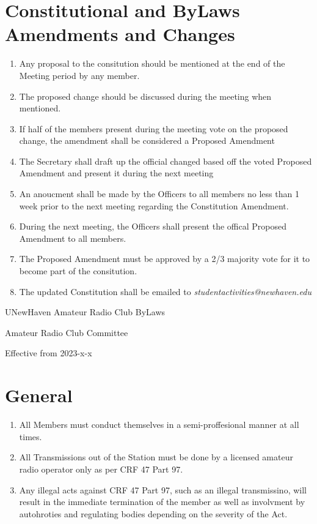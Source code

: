 \documentclass[a4paper,12pt]{article}
\begin{document}
\section{Constitutional and ByLaws Amendments and Changes}
\begin{enumerate}[label=\thesection.\arabic*.]
  \item Any proposal to the consitution should be mentioned at the end of the Meeting period by any member.
  \item The proposed change should be discussed during the meeting when mentioned.
  \item If half of the members present during the meeting vote on the proposed change, the amendment shall be considered a Proposed Amendment
  \item The Secretary shall draft up the official changed based off the voted Proposed Amendment and present it during the next meeting
  \item An anoucment shall be made by the Officers to all members no less than 1 week prior to the next meeting regarding the Constitution Amendment.
  \item During the next meeting, the Officers shall present the offical Proposed Amendment to all members.
  \item The Proposed Amendment must be approved by a 2/3 majority vote for it to become part of the consitution.
  \item The updated Constitution shall be emailed to \textit{studentactivities@newhaven.edu}
\end{enumerate}

\newpage
\begin{centering}
\huge{UNewHaven Amateur Radio Club ByLaws}

\large{Amateur Radio Club Committee}

\normalsize{Effective from 2023-x-x}

\end{centering}

\section{General}
\begin{enumerate}[label=\thesection.\arabic*.]
  \item All Members must conduct themselves in a semi-proffesional manner at all times.
  \item All Transmissions out of the Station must be done by a licensed amateur radio operator only as per CRF 47 Part 97.
  \item Any illegal acts against CRF 47 Part 97, such as an illegal transmissino, will result in the immediate termination of the member as well as involvment by autohroties and regulating bodies depending on the severity of the Act.
\end{enumerate}
\end{document}
